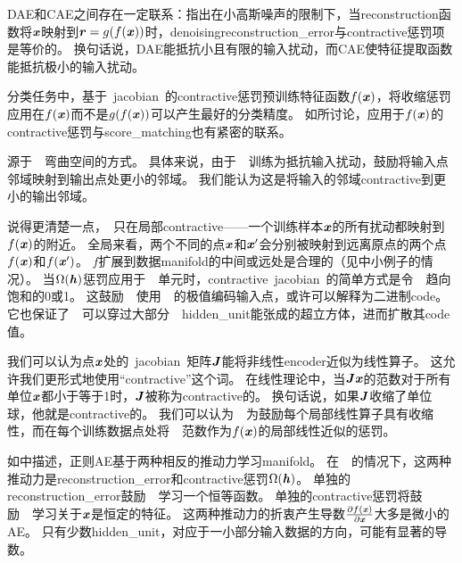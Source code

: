 \gls{DAE}和\gls{CAE}之间存在一定联系：\citet{Alain+Bengio-ICLR2013-small}指出在小高斯噪声的限制下，当\gls{reconstruction}函数将$\boldsymbol{\mathit{x}}$映射到$\boldsymbol{\mathit{r}} = g(f(\boldsymbol{\mathit{x}}))$时，\gls{denoising}\gls{reconstruction_error}与\gls{contractive}惩罚项是等价的。
换句话说，\gls{DAE}能抵抗小且有限的输入扰动，而\gls{CAE}使特征提取函数能抵抗极小的输入扰动。

分类任务中，基于~\gls{jacobian}~的\gls{contractive}惩罚预训练特征函数$f(\boldsymbol{\mathit{x}})$，将收缩惩罚应用在$f(\boldsymbol{\mathit{x}})$而不是$g(f(\boldsymbol{\mathit{x}}))$可以产生最好的分类精度。
如所讨论，应用于$f(\boldsymbol{\mathit{x}})$的\gls{contractive}惩罚与\gls{score_matching}也有紧密的联系。

源于~~弯曲空间的方式。
具体来说，由于~~训练为抵抗输入扰动，鼓励将输入点邻域映射到输出点处更小的邻域。
我们能认为这是将输入的邻域\gls{contractive}到更小的输出邻域。


说得更清楚一点，~只在局部\gls{contractive}——一个训练样本$\boldsymbol{\mathit{x}}$的所有扰动都映射到$f(\boldsymbol{\mathit{x}})$的附近。
全局来看，两个不同的点$\boldsymbol{\mathit{x}}$和$\boldsymbol{\mathit{x}}'$会分别被映射到远离原点的两个点$f(\boldsymbol{\mathit{x}})$和$f(\boldsymbol{\mathit{x}}')$。
$f$扩展到数据\gls{manifold}的中间或远处是合理的（见中小例子的情况）。
当$\Omega(\boldsymbol{\mathit{h}})$惩罚应用于~~单元时，\gls{contractive}~\gls{jacobian}~的简单方式是令~~趋向饱和的0或1。
这鼓励~~使用~~的极值编码输入点，或许可以解释为二进制\gls{code}。
它也保证了~~可以穿过大部分~~\gls{hidden_unit}能张成的超立方体，进而扩散其\gls{code}值。

我们可以认为点$\boldsymbol{\mathit{x}}$处的~\gls{jacobian}~矩阵$\boldsymbol{\mathit{J}}$能将非线性\gls{encoder}近似为线性算子。
这允许我们更形式地使用``\gls{contractive}''这个词。
在线性理论中，当$\boldsymbol{\mathit{J}}\boldsymbol{\mathit{x}}$的范数对于所有单位$\boldsymbol{\mathit{x}}$都小于等于1时，$\boldsymbol{\mathit{J}}$被称为\gls{contractive}的。
换句话说，如果$\boldsymbol{\mathit{J}}$收缩了单位球，他就是\gls{contractive}的。
我们可以认为~~为鼓励每个局部线性算子具有收缩性，而在每个训练数据点处将~~范数作为$f(\boldsymbol{\mathit{x}})$的局部线性近似的惩罚。


如中描述，正则\gls{AE}基于两种相反的推动力学习\gls{manifold}。
在~~的情况下，这两种推动力是\gls{reconstruction_error}和\gls{contractive}惩罚$\Omega(\boldsymbol{\mathit{h}})$。
单独的\gls{reconstruction_error}鼓励~~学习一个恒等函数。
单独的\gls{contractive}惩罚将鼓励~~学习关于$\boldsymbol{\mathit{x}}$是恒定的特征。
这两种推动力的折衷产生导数$\frac{\partial f(\boldsymbol{\mathit{x}})}{\partial \boldsymbol{\mathit{x}}}$大多是微小的\gls{AE}。
只有少数\gls{hidden_unit}，对应于一小部分输入数据的方向，可能有显著的导数。


